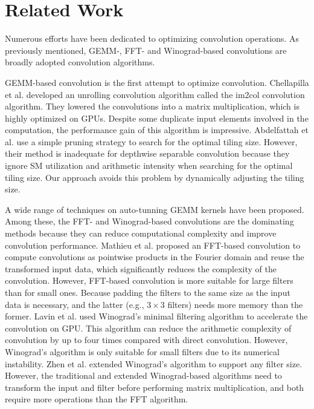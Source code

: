 \section{Related Work}
Numerous efforts have been dedicated to optimizing convolution operations. As previously mentioned, GEMM-, FFT- and
Winograd-based convolutions are broadly adopted convolution algorithms.

GEMM-based convolution is the first attempt to optimize convolution. Chellapilla et al. \cite{Chellapilla2006High} developed an unrolling
convolution algorithm  called the im2col convolution algorithm. They lowered the convolutions into a matrix multiplication, which is highly
optimized on GPUs. Despite some duplicate input elements involved in the computation, the performance gain of this algorithm is impressive.
Abdelfattah et al. \cite{abdelfattah2019fast} use a simple pruning strategy to search for the optimal tiling size. However, their method is
inadequate for depthwise separable convolution because they ignore SM utilization and arithmetic intensity when searching for the optimal
tiling size. Our approach avoids this problem by dynamically adjusting the tiling size.

A wide range of techniques on auto-tunning GEMM kernels have been proposed. Among these, the FFT- and Winograd-based convolutions are the
dominating methods because they can reduce computational complexity and improve convolution performance. Mathieu et al.
\cite{mathieu2013fast} proposed an FFT-based convolution to compute convolutions as pointwise products in the Fourier domain and reuse the
transformed input data, which significantly reduces the complexity of the convolution. However, FFT-based convolution is more suitable for
large filters than for small ones. Because padding the filters to the same size as the input data is necessary, and  the latter (e.g., $3
\times 3$ filters) needs more memory than the former. Lavin et al. \cite{lavin2016fast} used Winograd's minimal filtering algorithm to
accelerate the convolution on GPU. This algorithm can reduce the arithmetic complexity of convolution by up to four times compared with
direct convolution. However, Winograd's algorithm is only suitable for small filters due to its numerical instability. Zhen et al.
\cite{Zhen2018Optimizing} extended Winograd's algorithm to support any filter size. However, the traditional and extended Winograd-based
algorithms need to transform the input and filter before performing matrix multiplication, and both require more operations than the FFT
algorithm.

